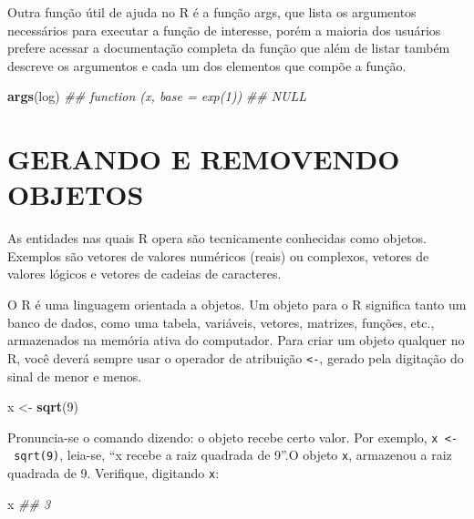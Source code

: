 \documentclass[
  11pt,
  a5paper,
  openany]{book}
\newenvironment{Shaded}{\begin{snugshade}}{\end{snugshade}}
\newcommand{\CommentTok}[1]{\textcolor[rgb]{0.56,0.35,0.01}{\textit{#1}}}
\newcommand{\DecValTok}[1]{\textcolor[rgb]{0.00,0.00,0.81}{#1}}
\newcommand{\KeywordTok}[1]{\textcolor[rgb]{0.13,0.29,0.53}{\textbf{#1}}}
\newcommand{\NormalTok}[1]{#1}
\newcommand{\StringTok}[1]{\textcolor[rgb]{0.31,0.60,0.02}{#1}}
\begin{document}
Outra função útil de ajuda no R é a função args, que lista os argumentos necessários para executar a função de interesse, porém a maioria dos usuários prefere acessar a documentação completa da função que além de listar também descreve os argumentos e cada um dos elementos que compõe a função.

\begin{Shaded}
\begin{Highlighting}[]
\KeywordTok{args}\NormalTok{(log)}
\CommentTok{## function (x, base = exp(1)) }
\CommentTok{##   NULL}
\end{Highlighting}
\end{Shaded}

\hypertarget{gerando-e-removendo-objetos}{%
\section{GERANDO E REMOVENDO OBJETOS}\label{gerando-e-removendo-objetos}}

As entidades nas quais R opera são tecnicamente conhecidas como objetos. Exemplos são vetores de valores numéricos (reais) ou complexos, vetores de valores lógicos e vetores de cadeias de caracteres.

O R é uma linguagem orientada a objetos. Um objeto para o R significa tanto um banco de dados, como uma tabela, variáveis, vetores, matrizes, funções, etc., armazenados na memória ativa do computador. Para criar um objeto qualquer no R, você deverá sempre usar o operador de atribuição \texttt{\textless{}-}, gerado pela digitação do sinal de menor e menos.

\begin{Shaded}
\begin{Highlighting}[]
\NormalTok{x <-}\StringTok{ }\KeywordTok{sqrt}\NormalTok{(}\DecValTok{9}\NormalTok{)}
\end{Highlighting}
\end{Shaded}

Pronuncia-se o comando dizendo: o objeto recebe certo valor. Por exemplo, \texttt{x\ \textless{}-\ sqrt(9)}, leia-se, ``x recebe a raiz quadrada de 9''.O objeto \texttt{x}, armazenou a raiz quadrada de 9. Verifique, digitando \texttt{x}:

\begin{Shaded}
\begin{Highlighting}[]
\NormalTok{x}
\CommentTok{## 3}
\end{Highlighting}
\end{Shaded}
\end{document}
